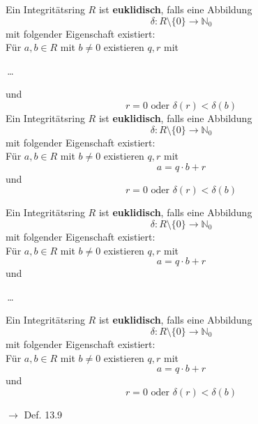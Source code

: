 \documentclass[11pt]{article}
\renewcommand{\cite}[1]{\par\bigskip\hfill{\color{gray}\tiny\(\to\) #1}}
\newcommand{\NN}{\mathbb{N}}
\let\olddots\dots
\renewcommand{\dots}{\,\olddots\,}
\newenvironment{field}{}{\newpage}
\newif\ifnote
\newenvironment{note}{\notetrue}{\notefalse}
\newcommand{\localtag}{}
\newcommand{\globaltag}{}
\newcommand{\uuid}{}
\newcommand{\tags}[1]{
    \ifnote
        \renewcommand{\localtag}{#1}
    \else
        \renewcommand{\globaltag}{#1}
    \fi
    }
\newcommand{\xplain}[1]{\renewcommand{\uuid}{#1}}
\begin{document}
\begin{note}
    \tags{Def}
    \xplain{f86a676e-ef48-4e9b-a39b-9bf39ad9c931}

    \begin{field}
        Ein Integritätsring $R$ ist \textbf{euklidisch}, falls eine Abbildung
        \[\delta: R\setminus \{0\} \longrightarrow \NN_0\]
        mit folgender Eigenschaft existiert:\\
        Für $a,b\in R$ mit $b\neq 0$ existieren $q,r$ mit        \begin{center}\dots\end{center}

        und
        \[r=0 \text{ oder } \delta(r) < \delta(b)\]
    \end{field}
    \begin{field}
        Ein Integritätsring $R$ ist \textbf{euklidisch}, falls eine Abbildung
        \[\delta: R\setminus \{0\} \longrightarrow \NN_0\]
        mit folgender Eigenschaft existiert:\\
        Für $a,b\in R$ mit $b\neq 0$ existieren $q,r$ mit
        \[ a = q\cdot b + r\]
        und
        \[r=0 \text{ oder } \delta(r) < \delta(b)\]
    \end{field}

    \begin{field}
        Ein Integritätsring $R$ ist \textbf{euklidisch}, falls eine Abbildung
        \[\delta: R\setminus \{0\} \longrightarrow \NN_0\]
        mit folgender Eigenschaft existiert:\\
        Für $a,b\in R$ mit $b\neq 0$ existieren $q,r$ mit
        \[ a = q\cdot b + r\]
        und
        \begin{center}\dots\end{center}
    \end{field}
    \begin{field}
        Ein Integritätsring $R$ ist \textbf{euklidisch}, falls eine Abbildung
        \[\delta: R\setminus \{0\} \longrightarrow \NN_0\]
        mit folgender Eigenschaft existiert:\\
        Für $a,b\in R$ mit $b\neq 0$ existieren $q,r$ mit
        \[ a = q\cdot b + r\]
        und
        \[r=0 \text{ oder } \delta(r) < \delta(b)\]
        \cite{Def. 13.9}
    \end{field}
\end{note}
\end{document}
